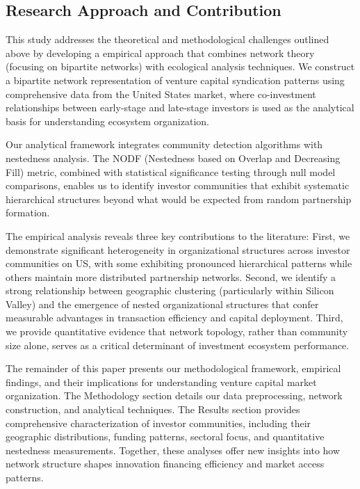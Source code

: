 \subsection{Research Approach and Contribution}

This study addresses the theoretical and methodological challenges outlined above by developing a empirical approach that combines network theory (focusing on bipartite networks) with ecological analysis techniques. We construct a bipartite network representation of venture capital syndication patterns using comprehensive data from the United States market, where co-investment relationships between early-stage and late-stage investors is used as the analytical basis for understanding ecosystem organization.

Our analytical framework integrates community detection algorithms with nestedness analysis. The NODF (Nestedness based on Overlap and Decreasing Fill) metric, combined with statistical significance testing through null model comparisons, enables us to identify investor communities that exhibit systematic hierarchical structures beyond what would be expected from random partnership formation.

The empirical analysis reveals three key contributions to the literature: First, we demonstrate significant heterogeneity in organizational structures across investor communities on US, with some exhibiting pronounced hierarchical patterns while others maintain more distributed partnership networks. Second, we identify a strong relationship between geographic clustering (particularly within Silicon Valley) and the emergence of nested organizational structures that confer measurable advantages in transaction efficiency and capital deployment. Third, we provide quantitative evidence that network topology, rather than community size alone, serves as a critical determinant of investment ecosystem performance.

The remainder of this paper presents our methodological framework, empirical findings, and their implications for understanding venture capital market organization. The Methodology section details our data preprocessing, network construction, and analytical techniques. The Results section provides comprehensive characterization of investor communities, including their geographic distributions, funding patterns, sectoral focus, and quantitative nestedness measurements. Together, these analyses offer new insights into how network structure shapes innovation financing efficiency and market access patterns.